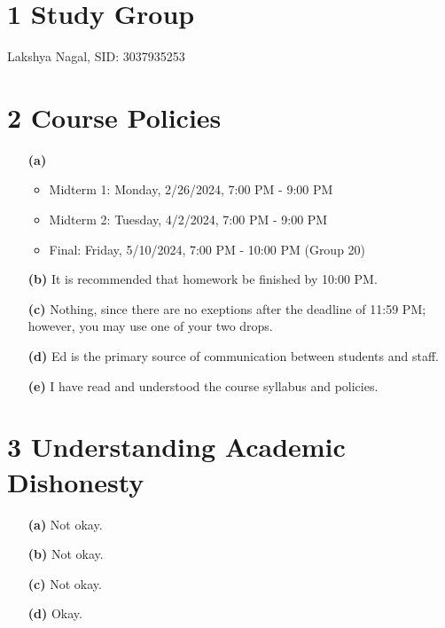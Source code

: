 \documentclass[12pt]{article}
\begin{document}
    \section*{1 Study Group}
    \color{blue}
    Lakshya Nagal, SID: 3037935253 
    \color{black}
    \newpage
    \section*{2 Course Policies}
    \begin{enumerate}
        \item[\textbf{(a)}]
        \color{blue}
            \begin{itemize}
                \item Midterm 1: Monday, 2/26/2024, 7:00 PM - 9:00 PM
                \item Midterm 2: Tuesday, 4/2/2024, 7:00 PM - 9:00 PM
                \item Final: Friday, 5/10/2024, 7:00 PM - 10:00 PM (Group 20)
            \end{itemize}
        \color{black}
        \item[\textbf{(b)}]
        \color{blue}
            It is recommended that homework be finished by 10:00 PM.
        \color{black}
        \item[\textbf{(c)}]
        \color{blue}
            Nothing, since there are no exeptions after the deadline of 11:59 PM; however, you may
            use one of your two drops.
        \color{black}
        \item[\textbf{(d)}]
        \color{blue}
            Ed is the primary source of communication between students and staff.
        \color{black}
        \item[\textbf{(e)}]  
        \color{blue}
            I have read and understood the course syllabus and policies.
    \end{enumerate}
    \newpage
    \section*{3 Understanding Academic Dishonesty}
    \begin{enumerate}
        \color{black}
        \item[\textbf{(a)}] 
        \color{blue}
        Not okay.
        \color{black}
        \item[\textbf{(b)}] 
        \color{blue}
        Not okay.
        \color{black}
        \item[\textbf{(c)}] 
        \color{blue}
        Not okay.
        \color{black}
        \item[\textbf{(d)}] 
        \color{blue}
        Okay.  
    \end{enumerate}
    \newpage
\end{document}
